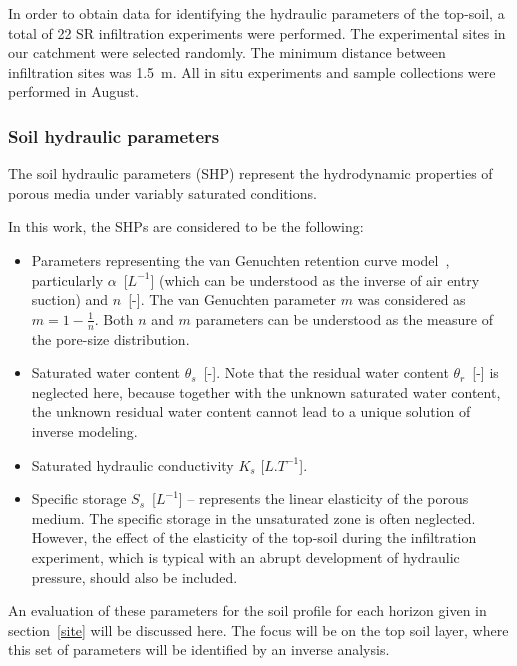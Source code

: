 \documentclass[review]{myarticle}
\begin{document}
In order to obtain data for identifying the hydraulic parameters of the top-soil, a total of 22 SR infiltration experiments were performed. The experimental sites in our catchment were  selected randomly. The minimum distance between infiltration sites was 1.5~m. All in situ experiments and sample collections were performed in August.

\subsubsection{Soil hydraulic parameters}
\label{shp}

The soil hydraulic parameters (SHP) represent the hydrodynamic properties of porous media under variably saturated conditions.

In this work, the SHPs are considered to be the following:

\begin{itemize}
\item Parameters representing the van Genuchten retention curve model~\citep{vangenuchten}, particularly $\alpha$~[$L^{-1}$] (which can be understood as the inverse of air entry suction) and $n$~[-]. The van Genuchten parameter $m$ was considered as $m=1-\frac{1}{n}$. Both $n$ and $m$ parameters can be understood as the measure of the pore-size distribution.
\item Saturated water content $\theta_s$~[-]. Note that the residual water content $\theta_r$~[-] is neglected here, because together with the unknown saturated water content, the unknown residual water content cannot lead to a unique solution of inverse modeling.
\item Saturated hydraulic conductivity $K_s$ [$L.T^{-1}$]. 
\item Specific storage $S_s$~[$L^{-1}$] -- represents the linear elasticity of the porous medium. The specific storage in the unsaturated zone is often neglected. However, the effect of the elasticity of the top-soil during the infiltration experiment, which is typical with an abrupt development of hydraulic pressure, should also be included.
\end{itemize}

An evaluation of these parameters for the soil profile for each horizon given in section~\ref{site} will be discussed here. The focus will be on the top soil layer, where this set of parameters will be identified by an inverse analysis.
\end{document}

